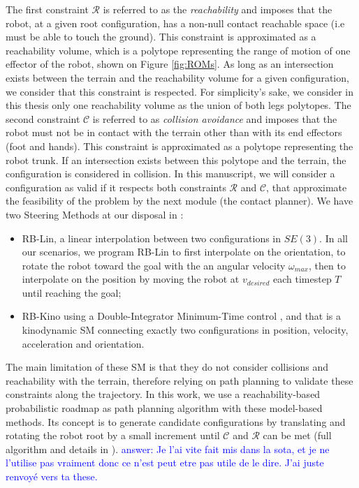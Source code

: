 The first constraint $\mathcal{R}$ is referred to as the \textit{reachability} and imposes that the robot, at a given root configuration, has a non-null contact reachable space (i.e must be able to touch the ground). 
This constraint is approximated as a reachability volume, which is a polytope representing the range of motion of one effector of the robot, shown on Figure \ref{fig:ROMs}.
As long as an intersection exists between the terrain and the reachability volume for a given configuration, we consider that this constraint is respected.
For simplicity's sake, we consider in this thesis only one reachability volume as the union of both legs polytopes.
The second constraint $\mathcal{C}$ is referred to as \textit{collision avoidance} and imposes that the robot must not be in contact with the terrain other than with its end effectors (foot and hands). This constraint is approximated as a polytope representing the robot trunk. If an intersection exists between this polytope and the terrain, the configuration is considered in collision.
In this manuscript, we will consider a configuration as valid if it respects both constraints $\mathcal{R}$ and $\mathcal{C}$, that approximate the feasibility of the problem by the next module (the contact planner).
We have two Steering Methods at our disposal in \cite{loco3d}:
\begin{itemize}
    \item RB-Lin, a linear interpolation between two configurations in $SE(3)$. In all our scenarios, we program RB-Lin to first interpolate on the orientation, to rotate the robot toward the goal with the an angular velocity $\omega_{max}$, then to interpolate on the position by moving the robot at $v_{desired}$ each timestep $T$ until reaching the goal;
    \item RB-Kino \cite{kinodynamic-sm} using a Double-Integrator Minimum-Time control \cite{DIMT}, and that is a kinodynamic SM connecting exactly two configurations in position, velocity, acceleration and orientation.
\end{itemize}
The main limitation of these SM is that they do not consider collisions and reachability with the terrain, therefore relying on path planning to validate these constraints along the trajectory.
In this work, we use a reachability-based probabilistic roadmap \cite{RB-PRM} as path planning algorithm with these model-based methods. 
Its concept is to generate candidate configurations by translating and rotating the robot root by a small increment until $\mathcal{C}$ and $\mathcal{R}$ can be met (full algorithm and details in \cite{thesis_steve}).
\textcolor{blue}{answer: Je l'ai vite fait mis dans la sota, et je ne l'utilise pas vraiment donc ce n'est peut etre pas utile de le dire. J'ai juste renvoyé vers ta these.}

